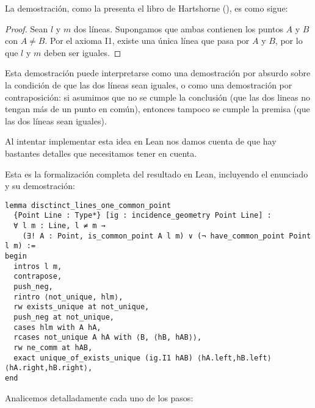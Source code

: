 
La demostración, como la presenta el libro de Hartshorne (), es como
sigue:
\begin{proof}
	Sean $l$ y $m$ dos líneas. Supongamos que ambas contienen los puntos $A$ y
	$B$ con $A\ne B$. Por el axioma I1, existe una única línea que pasa por $A$
	y $B$, por lo que $l$ y $m$ deben ser iguales.
\end{proof}

Esta demostración puede interpretarse como una demostración por absurdo sobre la
condición de que las dos líneas sean iguales, o como una demostración por
contraposición: si asumimos que no se cumple la conclusión (que las dos lineas
no tengan más de un punto en común), entonces tampoco se cumple la premisa (que las
dos líneas sean iguales).

Al intentar implementar esta idea en Lean nos damos cuenta de que hay bastantes
detalles que necesitamos tener en cuenta.

Esta es la formalización completa del resultado en Lean, incluyendo el enunciado
y su demostración:

\begin{lstlisting}
lemma disctinct_lines_one_common_point 
  {Point Line : Type*} [ig : incidence_geometry Point Line] :
  ∀ l m : Line, l ≠ m → 
    (∃! A : Point, is_common_point A l m) ∨ (¬ have_common_point Point l m) := 
begin
  intros l m, 
  contrapose,
  push_neg,
  rintro ⟨not_unique, hlm⟩,
  rw exists_unique at not_unique,
  push_neg at not_unique,
  cases hlm with A hA,
  rcases not_unique A hA with ⟨B, ⟨hB, hAB⟩⟩,
  rw ne_comm at hAB,
  exact unique_of_exists_unique (ig.I1 hAB) ⟨hA.left,hB.left⟩ ⟨hA.right,hB.right⟩,
end
\end{lstlisting}


Analicemos detalladamente cada uno de los pasos:

